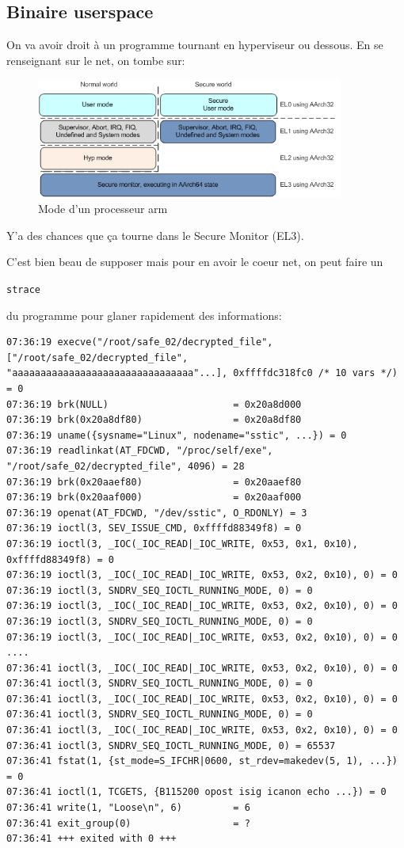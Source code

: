 \documentclass[14pt]{article}
\newcommand{\inlinebox}[2]{%
\colorbox{bg}{%
\parbox[b][0.6em]{\widthof{\texttt{#2}}}{\texttt{#2}}
}
}
\newcommand{\inlinebash}[1]{ \inlinebox{bash}{#1} }
\theoremstyle{definition}
\begin{document}
\subsection{Binaire userspace}
On va avoir droit à un programme tournant en hyperviseur ou dessous. En se renseignant sur le net, on tombe sur:
\begin{figure}[H]
\centering
\includegraphics[width=0.9\textwidth]{./screenshots/map_processor_modes_to_aarch32.png}
  \caption{Mode d'un processeur arm}
  \label{fig:p3_processor_modes}
\end{figure}
Y'a des chances que ça tourne dans le Secure Monitor (EL3).


C'est bien beau de supposer mais pour en avoir le coeur net, on peut faire un \inlinebash{strace} du programme pour glaner rapidement des informations:
\begin{verbatim}
07:36:19 execve("/root/safe_02/decrypted_file", ["/root/safe_02/decrypted_file", "aaaaaaaaaaaaaaaaaaaaaaaaaaaaaaaa"...], 0xffffdc318fc0 /* 10 vars */) = 0
07:36:19 brk(NULL)                      = 0x20a8d000
07:36:19 brk(0x20a8df80)                = 0x20a8df80
07:36:19 uname({sysname="Linux", nodename="sstic", ...}) = 0
07:36:19 readlinkat(AT_FDCWD, "/proc/self/exe", "/root/safe_02/decrypted_file", 4096) = 28
07:36:19 brk(0x20aaef80)                = 0x20aaef80
07:36:19 brk(0x20aaf000)                = 0x20aaf000
07:36:19 openat(AT_FDCWD, "/dev/sstic", O_RDONLY) = 3
07:36:19 ioctl(3, SEV_ISSUE_CMD, 0xffffd88349f8) = 0
07:36:19 ioctl(3, _IOC(_IOC_READ|_IOC_WRITE, 0x53, 0x1, 0x10), 0xffffd88349f8) = 0
07:36:19 ioctl(3, _IOC(_IOC_READ|_IOC_WRITE, 0x53, 0x2, 0x10), 0) = 0
07:36:19 ioctl(3, SNDRV_SEQ_IOCTL_RUNNING_MODE, 0) = 0
07:36:19 ioctl(3, _IOC(_IOC_READ|_IOC_WRITE, 0x53, 0x2, 0x10), 0) = 0
07:36:19 ioctl(3, SNDRV_SEQ_IOCTL_RUNNING_MODE, 0) = 0
07:36:19 ioctl(3, _IOC(_IOC_READ|_IOC_WRITE, 0x53, 0x2, 0x10), 0) = 0
....
07:36:41 ioctl(3, _IOC(_IOC_READ|_IOC_WRITE, 0x53, 0x2, 0x10), 0) = 0
07:36:41 ioctl(3, SNDRV_SEQ_IOCTL_RUNNING_MODE, 0) = 0
07:36:41 ioctl(3, _IOC(_IOC_READ|_IOC_WRITE, 0x53, 0x2, 0x10), 0) = 0
07:36:41 ioctl(3, SNDRV_SEQ_IOCTL_RUNNING_MODE, 0) = 0
07:36:41 ioctl(3, _IOC(_IOC_READ|_IOC_WRITE, 0x53, 0x2, 0x10), 0) = 0
07:36:41 ioctl(3, SNDRV_SEQ_IOCTL_RUNNING_MODE, 0) = 65537
07:36:41 fstat(1, {st_mode=S_IFCHR|0600, st_rdev=makedev(5, 1), ...}) = 0
07:36:41 ioctl(1, TCGETS, {B115200 opost isig icanon echo ...}) = 0
07:36:41 write(1, "Loose\n", 6)         = 6
07:36:41 exit_group(0)                  = ?
07:36:41 +++ exited with 0 +++
\end{verbatim}
\end{document}
